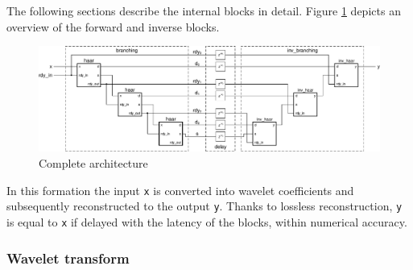 \begin{refsection}
The following sections describe the internal blocks in detail.
Figure \ref{fpga:fig:mainDelay} depicts an overview of the forward and inverse blocks.
\begin{figure} %
	\centering
	\includegraphics[width=\textwidth]{papers/fpga/images/main_delay.pdf}
	\caption{Complete architecture \label{fpga:fig:mainDelay}}
\end{figure}
In this formation the input \texttt{x} is converted into wavelet coefficients and subsequently reconstructed to the output \texttt{y}.
Thanks to lossless reconstruction, \texttt{y} is equal to \texttt{x} if delayed with the latency of the blocks, within numerical accuracy.

\subsubsection{Wavelet transform}


\end{refsection}
